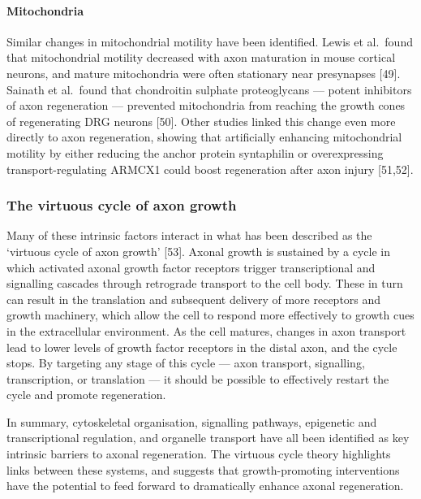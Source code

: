 \documentclass[
  12pt,
  a4paper,
]{book}
\begin{document}
\hypertarget{mitochondria}{%
\paragraph{Mitochondria}\label{mitochondria}}

Similar changes in mitochondrial motility have been identified. Lewis et al.~found that mitochondrial motility decreased with axon maturation in mouse cortical neurons, and mature mitochondria were often stationary near presynapses {[}49{]}. Sainath et al.~found that chondroitin sulphate proteoglycans --- potent inhibitors of axon regeneration --- prevented mitochondria from reaching the growth cones of regenerating DRG neurons {[}50{]}. Other studies linked this change even more directly to axon regeneration, showing that artificially enhancing mitochondrial motility by either reducing the anchor protein syntaphilin or overexpressing transport-regulating ARMCX1 could boost regeneration after axon injury {[}51,52{]}.

\hypertarget{the-virtuous-cycle-of-axon-growth}{%
\subsubsection{The virtuous cycle of axon growth}\label{the-virtuous-cycle-of-axon-growth}}

Many of these intrinsic factors interact in what has been described as the `virtuous cycle of axon growth' {[}53{]}. Axonal growth is sustained by a cycle in which activated axonal growth factor receptors trigger transcriptional and signalling cascades through retrograde transport to the cell body. These in turn can result in the translation and subsequent delivery of more receptors and growth machinery, which allow the cell to respond more effectively to growth cues in the extracellular environment. As the cell matures, changes in axon transport lead to lower levels of growth factor receptors in the distal axon, and the cycle stops. By targeting any stage of this cycle --- axon transport, signalling, transcription, or translation --- it should be possible to effectively restart the cycle and promote regeneration.

In summary, cytoskeletal organisation, signalling pathways, epigenetic and transcriptional regulation, and organelle transport have all been identified as key intrinsic barriers to axonal regeneration. The virtuous cycle theory highlights links between these systems, and suggests that growth-promoting interventions have the potential to feed forward to dramatically enhance axonal regeneration.
\end{document}
